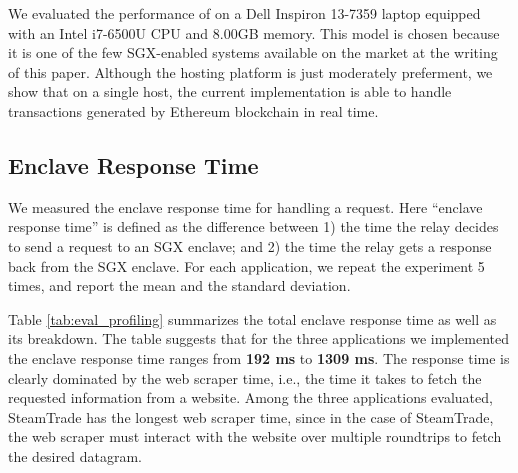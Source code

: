 We evaluated the performance of \tc on a Dell Inspiron 13-7359 laptop equipped
with an Intel i7-6500U CPU and 8.00GB memory.  This model is chosen 
because it is one of the few SGX-enabled systems available on the market at the
writing of this paper. Although the hosting platform is just moderately preferment, we
show that on a single host, the current implementation is able to handle 
transactions generated by Ethereum blockchain in real time. 


\subsection{Enclave Response Time}
We measured the enclave response time for handling a request. Here ``enclave response time''
is defined as the difference between 1) the time 
the relay decides to send a request to an SGX enclave;
and 2) the time the relay gets a response back from the SGX enclave. 
For each application, we repeat the  
experiment 5 times, and report the mean and the standard deviation.  


Table \ref{tab:eval_profiling} summarizes the total enclave response
time as well as its breakdown. 
The table suggests that for the three applications we implemented
the enclave response time ranges from {\bf 192 ms}
to {\bf 1309 ms}.  
The response time 
is clearly dominated by the web scraper time, i.e., the time it takes to 
fetch the requested information from a website.
Among the three applications 
evaluated, {\sf SteamTrade} has the longest web scraper time, 
since in the case of {\sf SteamTrade}, the web scraper
must interact with the website over multiple roundtrips to fetch the desired datagram.




